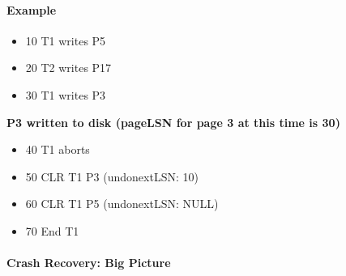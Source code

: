 \paragraph{Example}
\begin{itemize}
\item 10 T1 writes  P5
\item 20 T2 writes P17
\item 30 T1 writes P3
\end{itemize}
\textbf{P3 written to disk (pageLSN for page 3 at this time is 30)}
\begin{itemize}
\item 40 T1 aborts
\item 50 CLR T1 P3 (undonextLSN: 10)
\item 60 CLR T1 P5 (undonextLSN: NULL)
\item 70 End T1
\end{itemize}


\paragraph{Crash Recovery: Big Picture}


